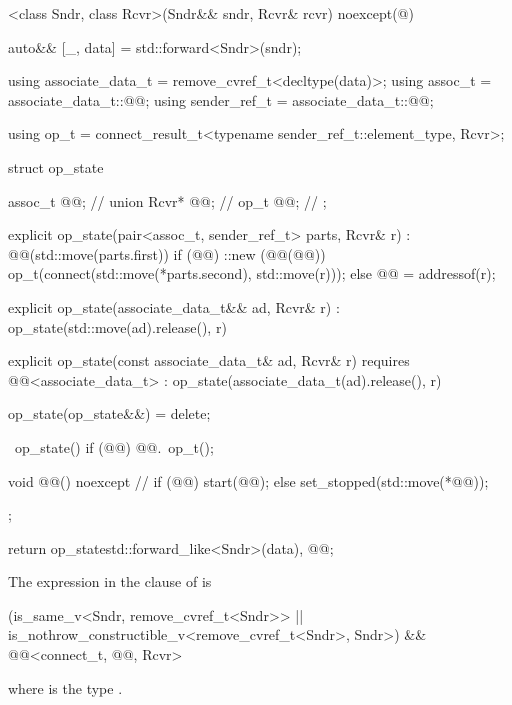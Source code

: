 \begin{codeblock}
[]<class Sndr, class Rcvr>(Sndr&& sndr, Rcvr& rcvr) noexcept(@\seebelow@) {
  auto&& [_, data] = std::forward<Sndr>(sndr);

  using associate_data_t = remove_cvref_t<decltype(data)>;
  using assoc_t = associate_data_t::@@;
  using sender_ref_t = associate_data_t::@@;

  using op_t = connect_result_t<typename sender_ref_t::element_type, Rcvr>;

  struct op_state {
    assoc_t @@;              // \expos
    union {
      Rcvr* @@;               // \expos
      op_t @@;                  // \expos
    };

    explicit op_state(pair<assoc_t, sender_ref_t> parts, Rcvr& r)
      : @@(std::move(parts.first)) {
      if (@@) {
        ::new (@@(@@)) op_t(connect(std::move(*parts.second), std::move(r)));
      } else {
        @@ = addressof(r);
      }
    }

    explicit op_state(associate_data_t&& ad, Rcvr& r)
      : op_state(std::move(ad).release(), r) {}

    explicit op_state(const associate_data_t& ad, Rcvr& r)
      requires @@<associate_data_t>
      : op_state(associate_data_t(ad).release(), r) {}

    op_state(op_state&&) = delete;

    ~op_state() {
      if (@@) {
        @@.~op_t();
      }
    }

    void @@() noexcept {       // \expos
      if (@@) {
        start(@@);
      } else {
        set_stopped(std::move(*@@));
      }
    }
  };

  return op_state{std::forward_like<Sndr>(data), @@};
}
\end{codeblock}

\pnum
The expression in the  clause of
 is
\begin{codeblock}
(is_same_v<Sndr, remove_cvref_t<Sndr>> ||
 is_nothrow_constructible_v<remove_cvref_t<Sndr>, Sndr>) &&
@@<connect_t, @@, Rcvr>
\end{codeblock}
where  is the type
.

